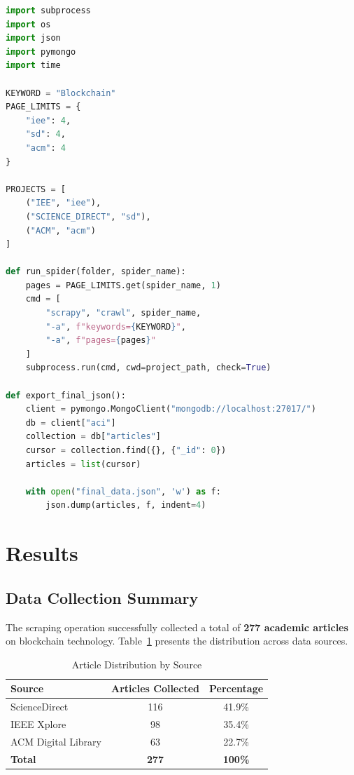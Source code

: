 \documentclass[12pt,a4paper]{article}
\begin{document}
\begin{lstlisting}[language=Python, caption={Main Orchestration Script (run\_all.py)}]
import subprocess
import os
import json
import pymongo
import time

KEYWORD = "Blockchain"
PAGE_LIMITS = {
    "iee": 4,
    "sd": 4,
    "acm": 4
}

PROJECTS = [
    ("IEE", "iee"),
    ("SCIENCE_DIRECT", "sd"),
    ("ACM", "acm")
]

def run_spider(folder, spider_name):
    pages = PAGE_LIMITS.get(spider_name, 1)
    cmd = [
        "scrapy", "crawl", spider_name,
        "-a", f"keywords={KEYWORD}",
        "-a", f"pages={pages}"
    ]
    subprocess.run(cmd, cwd=project_path, check=True)

def export_final_json():
    client = pymongo.MongoClient("mongodb://localhost:27017/")
    db = client["aci"]
    collection = db["articles"]
    cursor = collection.find({}, {"_id": 0})
    articles = list(cursor)
    
    with open("final_data.json", 'w') as f:
        json.dump(articles, f, indent=4)
\end{lstlisting}

\section{Results}

\subsection{Data Collection Summary}

The scraping operation successfully collected a total of \textbf{277 academic articles} on blockchain technology. Table~\ref{tab:sources} presents the distribution across data sources.

\begin{table}[H]
\centering
\caption{Article Distribution by Source}
\label{tab:sources}
\begin{tabular}{@{}lcc@{}}
\toprule
\textbf{Source} & \textbf{Articles Collected} & \textbf{Percentage} \\
\midrule
ScienceDirect & 116 & 41.9\% \\
IEEE Xplore & 98 & 35.4\% \\
ACM Digital Library & 63 & 22.7\% \\
\midrule
\textbf{Total} & \textbf{277} & \textbf{100\%} \\
\bottomrule
\end{tabular}
\end{table}
\end{document}
